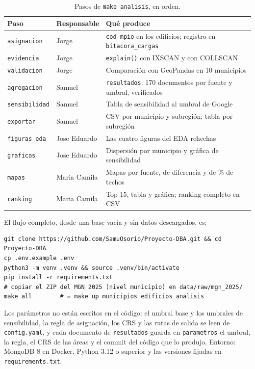 \documentclass[11pt,a4paper]{article}
\newcommand{\campo}[1]{\texttt{#1}}
\begin{document}
\begin{table}[H]
  \centering\small
  \caption{Pasos de \campo{make analisis}, en orden.}
  \label{tab:pasos}
  \begin{tabularx}{\textwidth}{@{}l l L@{}}
    \toprule
    \textbf{Paso} & \textbf{Responsable} & \textbf{Qué produce} \\
    \midrule
    \campo{asignacion} & Jorge & \campo{cod\_mpio} en los edificios; registro en \campo{bitacora\_cargas} \\
    \campo{evidencia} & Jorge & \campo{explain()} con IXSCAN y con COLLSCAN \\
    \campo{validacion} & Jorge & Comparación con GeoPandas en 10 municipios \\
    \campo{agregacion} & Samuel & \campo{resultados}: 170 documentos por fuente y umbral, verificados \\
    \campo{sensibilidad} & Samuel & Tabla de sensibilidad al umbral de Google \\
    \campo{exportar} & Samuel & CSV por municipio y subregión; tabla por subregión \\
    \campo{figuras\_eda} & Jose Eduardo & Las cuatro figuras del EDA rehechas \\
    \campo{graficas} & Jose Eduardo & Dispersión por municipio y gráfica de sensibilidad \\
    \campo{mapas} & Maria Camila & Mapas por fuente, de diferencia y de \% de techos \\
    \campo{ranking} & Maria Camila & Top 15, tabla y gráfica; ranking completo en CSV \\
    \bottomrule
  \end{tabularx}
\end{table}

El flujo completo, desde una base vacía y sin datos descargados, es:

\begin{lstlisting}
git clone https://github.com/SamuOsorio/Proyecto-DBA.git && cd Proyecto-DBA
cp .env.example .env
python3 -m venv .venv && source .venv/bin/activate
pip install -r requirements.txt
# copiar el ZIP del MGN 2025 (nivel municipio) en data/raw/mgn_2025/
make all        # = make up municipios edificios analisis
\end{lstlisting}

Los parámetros no están escritos en el código: el umbral base y los umbrales
de sensibilidad, la regla de asignación, los CRS y las rutas de salida se leen
de \campo{config.yaml}, y cada documento de \campo{resultados} guarda en
\campo{parametros} el umbral, la regla, el CRS de las áreas y el commit del
código que lo produjo. Entorno: MongoDB 8 en Docker, Python 3.12 o superior y las
versiones fijadas en \campo{requirements.txt}.
\end{document}
